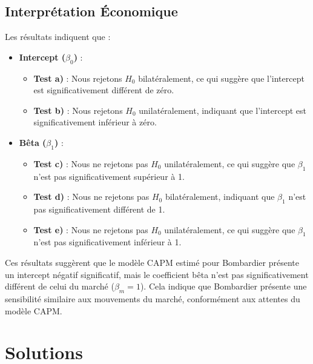 \documentclass[14pt]{extarticle} %
\theoremstyle{definition}
\theoremstyle{plain}
\begin{document}
\subsection{Interprétation Économique}

Les résultats indiquent que :

\begin{itemize}
    \item \textbf{Intercept (\(\beta_0\))} :
    \begin{itemize}
        \item \textbf{Test a)} : Nous rejetons \(H_0\) bilatéralement, ce qui suggère que l'intercept est significativement différent de zéro.
        \item \textbf{Test b)} : Nous rejetons \(H_0\) unilatéralement, indiquant que l'intercept est significativement inférieur à zéro.
    \end{itemize}
    \item \textbf{Bêta (\(\beta_1\))} :
    \begin{itemize}
        \item \textbf{Test c)} : Nous ne rejetons pas \(H_0\) unilatéralement, ce qui suggère que \(\beta_1\) n'est pas significativement supérieur à 1.
        \item \textbf{Test d)} : Nous ne rejetons pas \(H_0\) bilatéralement, indiquant que \(\beta_1\) n'est pas significativement différent de 1.
        \item \textbf{Test e)} : Nous ne rejetons pas \(H_0\) unilatéralement, ce qui suggère que \(\beta_1\) n'est pas significativement inférieur à 1.
    \end{itemize}
\end{itemize}

Ces résultats suggèrent que le modèle CAPM estimé pour Bombardier présente un intercept négatif significatif, mais le coefficient bêta n'est pas significativement différent de celui du marché (\(\beta_m = 1\)). Cela indique que Bombardier présente une sensibilité similaire aux mouvements du marché, conformément aux attentes du modèle CAPM.

\section*{Solutions}
\end{document}
